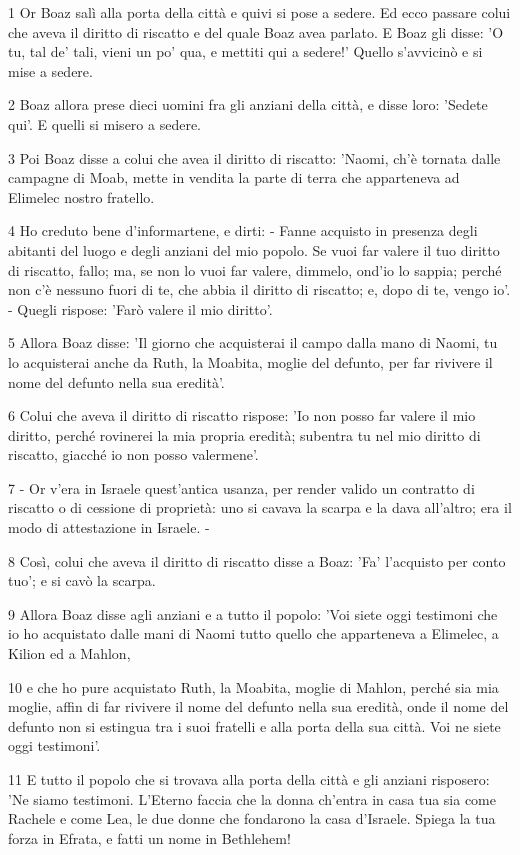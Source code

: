\par 1 Or Boaz salì alla porta della città e quivi si pose a sedere. Ed ecco passare colui che aveva il diritto di riscatto e del quale Boaz avea parlato. E Boaz gli disse: 'O tu, tal de' tali, vieni un po' qua, e mettiti qui a sedere!' Quello s'avvicinò e si mise a sedere.
\par 2 Boaz allora prese dieci uomini fra gli anziani della città, e disse loro: 'Sedete qui'. E quelli si misero a sedere.
\par 3 Poi Boaz disse a colui che avea il diritto di riscatto: 'Naomi, ch'è tornata dalle campagne di Moab, mette in vendita la parte di terra che apparteneva ad Elimelec nostro fratello.
\par 4 Ho creduto bene d'informartene, e dirti: - Fanne acquisto in presenza degli abitanti del luogo e degli anziani del mio popolo. Se vuoi far valere il tuo diritto di riscatto, fallo; ma, se non lo vuoi far valere, dimmelo, ond'io lo sappia; perché non c'è nessuno fuori di te, che abbia il diritto di riscatto; e, dopo di te, vengo io'. - Quegli rispose: 'Farò valere il mio diritto'.
\par 5 Allora Boaz disse: 'Il giorno che acquisterai il campo dalla mano di Naomi, tu lo acquisterai anche da Ruth, la Moabita, moglie del defunto, per far rivivere il nome del defunto nella sua eredità'.
\par 6 Colui che aveva il diritto di riscatto rispose: 'Io non posso far valere il mio diritto, perché rovinerei la mia propria eredità; subentra tu nel mio diritto di riscatto, giacché io non posso valermene'.
\par 7 - Or v'era in Israele quest'antica usanza, per render valido un contratto di riscatto o di cessione di proprietà: uno si cavava la scarpa e la dava all'altro; era il modo di attestazione in Israele. -
\par 8 Così, colui che aveva il diritto di riscatto disse a Boaz: 'Fa' l'acquisto per conto tuo'; e si cavò la scarpa.
\par 9 Allora Boaz disse agli anziani e a tutto il popolo: 'Voi siete oggi testimoni che io ho acquistato dalle mani di Naomi tutto quello che apparteneva a Elimelec, a Kilion ed a Mahlon,
\par 10 e che ho pure acquistato Ruth, la Moabita, moglie di Mahlon, perché sia mia moglie, affin di far rivivere il nome del defunto nella sua eredità, onde il nome del defunto non si estingua tra i suoi fratelli e alla porta della sua città. Voi ne siete oggi testimoni'.
\par 11 E tutto il popolo che si trovava alla porta della città e gli anziani risposero: 'Ne siamo testimoni. L'Eterno faccia che la donna ch'entra in casa tua sia come Rachele e come Lea, le due donne che fondarono la casa d'Israele. Spiega la tua forza in Efrata, e fatti un nome in Bethlehem!
